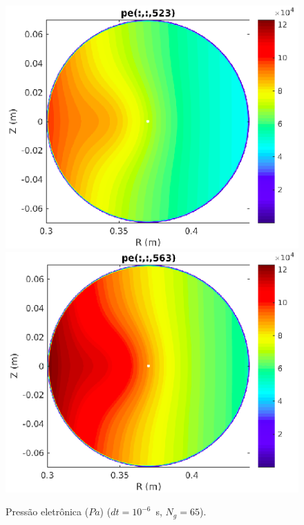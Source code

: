 \documentclass[12pt,oneside,a4paper]{abntex2}
\begin{document}
\begin{figure}[H]
\includegraphics[scale=0.4]{../SImulacao_breakdown/Adaptacao_nova/explicito/p523.png} 
\includegraphics[scale=0.4]{../SImulacao_breakdown/Adaptacao_nova/explicito/p563.png}  
\caption{Pressão eletrônica ($Pa$) ($dt=10^{-6}$\ s, $N_g = 65$).}
\label{p3}
\end{figure}
\end{document}
